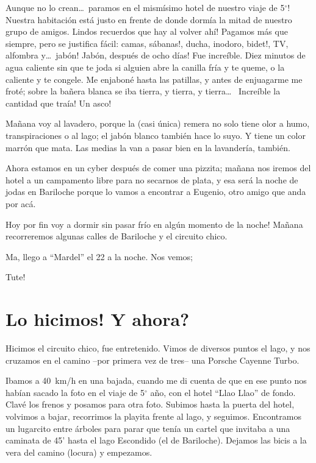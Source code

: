 Aunque no lo crean\ldots\ \textexclamdown paramos en el mism\'isimo hotel de
nuestro viaje de 5$^\circ$! Nuestra habitaci\'on est\'a justo en frente de donde
dorm\'ia la mitad de nuestro grupo de amigos. \textexclamdown Lindos recuerdos
que hay al volver ah\'i! Pagamos m\'as que siempre, pero se justifica f\'acil:
camas, \textexclamdown s\'abanas!, ducha, inodoro, \textexclamdown bidet!, TV,
alfombra y\ldots\ \textexclamdown jab\'on! \textexclamdown Jab\'on, despu\'es de
ocho d\'ias! Fue incre\'ible. Diez minutos de agua caliente sin que te joda si
alguien abre la canilla fr\'ia y te queme, o la caliente y te congele. Me
enjabon\'e hasta las patillas, y antes de enjuagarme me frot\'e; sobre la
ba\~nera blanca se iba tierra, y tierra, y tierra\ldots\ \textexclamdown
Incre\'ible la cantidad que tra\'ia! \textexclamdown Un asco!

Ma\~nana voy al lavadero, porque la (casi \'unica) remera no solo tiene olor a
humo, transpiraciones o al lago; el jab\'on blanco tambi\'en hace lo suyo. Y
tiene un color marr\'on que mata. Las medias la van a pasar bien en la
lavander\'ia, tambi\'en.

Ahora estamos en un cyber despu\'es de comer una pizzita; ma\~nana nos iremos
del hotel a un campamento libre para no secarnos de plata, y esa ser\'a la noche
de jodas en Bariloche porque lo vamos a encontrar a Eugenio, otro amigo que anda
por ac\'a.

\textexclamdown Hoy por fin voy a dormir sin pasar fr\'io en alg\'un momento de
la noche! Ma\~nana recorreremos algunas calles de Bariloche y el circuito chico.

Ma, llego a ``Mardel'' el 22 a la noche. Nos vemos;

\textexclamdown Tute!

\section{\textexclamdown Lo hicimos! \textquestiondown Y ahora?}

Hicimos el circuito chico, fue entretenido. Vimos de diversos puntos el lago, y
nos cruzamos en el camino --por primera vez de tres-- una Porsche Cayenne Turbo.

Ibamos a 40~km/h en una bajada, cuando me di cuenta de que en ese punto nos
hab\'ian sacado la foto en el viaje de 5$^\circ$ a\~no, con el hotel ``Llao
Llao'' de fondo. Clav\'e los frenos y posamos para otra foto. Subimos hasta la
puerta del hotel, volvimos a bajar, recorrimos la playita frente al lago, y
seguimos. Encontramos un lugarcito entre \'arboles para parar que ten\'ia un
cartel que invitaba a una caminata de 45' hasta el lago Escondido (el de
Bariloche). Dejamos las bicis a la vera del camino (locura) y empezamos.

